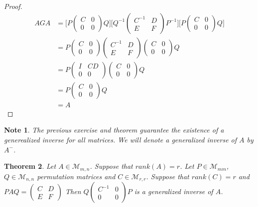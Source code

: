 \documentclass[12pt]{amsart}
\newtheorem{thm}{Theorem}[section]
\newtheorem{note}[thm]{Note}
\newcommand{\MM}{\mathcal{M}}
\begin{document}
\begin{proof}\
\begin{align*}
AGA 
&= \bigg[P
\begin{pmatrix}
C &0 \\
0 & 0
\end{pmatrix}
Q \bigg]\bigg[Q^{-1}
\begin{pmatrix}
C ^{-1}&D \\
E & F
\end{pmatrix}
P^{-1} \bigg] \bigg[P
\begin{pmatrix}
C &0 \\
0 & 0
\end{pmatrix}
Q\bigg] \\
&= P
\begin{pmatrix}
C &0 \\
0 & 0
\end{pmatrix}
\begin{pmatrix}
C ^{-1}&D \\
E & F
\end{pmatrix}
\begin{pmatrix}
C &0 \\
0 & 0
\end{pmatrix}
Q\\
&= P 
\begin{pmatrix}
I &CD \\
0 & 0
\end{pmatrix}
\begin{pmatrix}
C &0 \\
0 & 0
\end{pmatrix}
Q \\
&= P
\begin{pmatrix}
C &0 \\
0 & 0
\end{pmatrix}
Q \\
&= A
\end{align*}
\end{proof}


\begin{note}
The previous exercise and theorem guarantee the existence of a generealized inverse for all matrices.
We will denote a generalized inverse of $A$ by $A^-$.
\end{note}

\begin{thm}
Let $A \in \MM_{m,n}$. Suppose that $rank(A) = r$. Let $P \in \MM_{mm}$, $Q \in \MM_{n,n}$ permutation matrices and $C \in \MM_{r,r}$. Suppose that $rank(C) = r$ and $PAQ = \begin{pmatrix}
C &D \\
E &F
\end{pmatrix}$ Then $Q\begin{pmatrix}
C^{-1} &0 \\
0 &0
\end{pmatrix}P$ is a generalized inverse of $A$. 
\end{thm}
\end{document}
